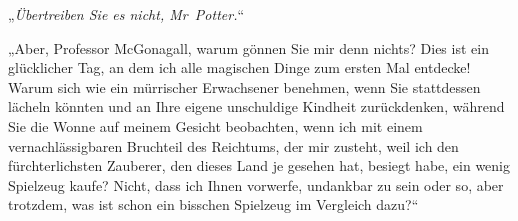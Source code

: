 „\emph{Übertreiben Sie es nicht, Mr~Potter.}“

„Aber, Professor McGonagall, warum gönnen Sie mir denn nichts? Dies ist ein glücklicher Tag, an dem ich alle magischen Dinge zum ersten Mal entdecke! Warum sich wie ein mürrischer Erwachsener benehmen, wenn Sie stattdessen lächeln könnten und an Ihre eigene unschuldige Kindheit zurückdenken, während Sie die Wonne auf meinem Gesicht beobachten, wenn ich mit einem vernachlässigbaren Bruchteil des Reichtums, der mir zusteht, weil ich den fürchterlichsten Zauberer, den dieses Land je gesehen hat, besiegt habe, ein wenig Spielzeug kaufe? Nicht, dass ich Ihnen vorwerfe, undankbar zu sein oder so, aber trotzdem, was ist schon ein bisschen Spielzeug im Vergleich dazu?“

